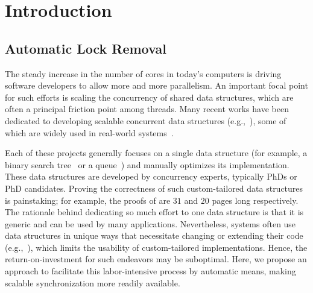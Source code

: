 
\section{Introduction} \label{sec:intro}

\subsection{Automatic Lock Removal}
The steady increase in the number of cores in today's computers is driving software developers to allow more and more parallelism.
An important focal point for such efforts is scaling the concurrency of shared data structures, which are often a principal friction point among threads.
Many recent works have been dedicated to developing scalable concurrent data
structures (e.g.,~\cite{ArbelA2014,DrachslerVY2014,NatarajanM2014,BrownER2014,CrainGR2013,BraginskyP2012,
AfekKKMT2012,EllenFRB2010,BronsonCCO2010,HerlihyLLS2007,fraser2004practical,Michael:1996}),
some of which are widely used in real-world systems~\cite{Ohad:OOPSLA11}.

Each of these projects generally focuses on a single data
structure (for example, a binary search tree~\cite{BronsonCCO2010} or a queue~\cite{Michael:1996}) and manually optimizes its implementation. These data structures are developed by concurrency experts, typically PhDs or PhD candidates.
Proving the correctness of such custom-tailored data structures is painstaking;
for example, the proofs of \cite{BraginskyP2012,EllenFRB2010} are $31$ and $20$ pages long
respectively.
The rationale behind dedicating so much effort to one data structure is that it is
generic and can be used by many applications. Nevertheless,  systems often use data structures in unique ways
that necessitate changing or extending their code (e.g.,~\cite{levelDB,jmonkey,OhadThesis,zyulkyarov2009atomic}), which limits the usability of custom-tailored
implementations. Hence, the return-on-investment for such endeavors may be suboptimal.
Here, we propose an approach to facilitate this labor-intensive process by automatic means,
making scalable synchronization more readily available.

